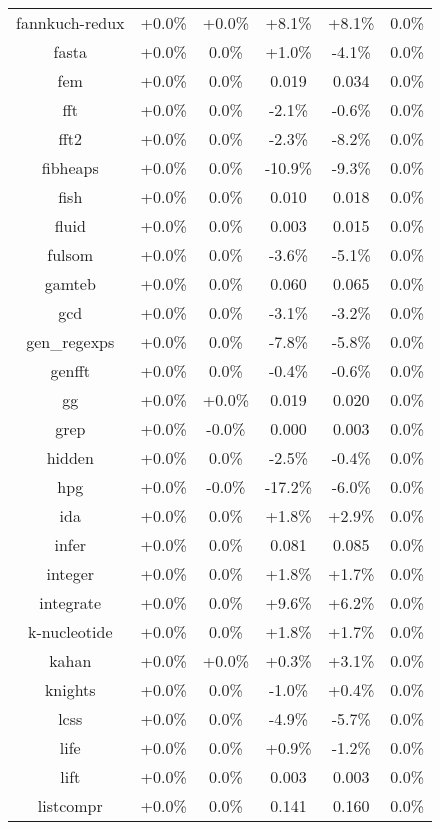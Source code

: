 \begin{tabular}{ c c c c c c }
fannkuch-redux & +0.0\% & +0.0\% & +8.1\% & +8.1\% &  0.0\%\\
fasta & +0.0\% &  0.0\% & +1.0\% & -4.1\% &  0.0\%\\
fem & +0.0\% &  0.0\% & 0.019 & 0.034 &  0.0\%\\
fft & +0.0\% &  0.0\% & -2.1\% & -0.6\% &  0.0\%\\
fft2 & +0.0\% &  0.0\% & -2.3\% & -8.2\% &  0.0\%\\
fibheaps & +0.0\% &  0.0\% & -10.9\% & -9.3\% &  0.0\%\\
fish & +0.0\% &  0.0\% & 0.010 & 0.018 &  0.0\%\\
fluid & +0.0\% &  0.0\% & 0.003 & 0.015 &  0.0\%\\
fulsom & +0.0\% &  0.0\% & -3.6\% & -5.1\% &  0.0\%\\
gamteb & +0.0\% &  0.0\% & 0.060 & 0.065 &  0.0\%\\
gcd & +0.0\% &  0.0\% & -3.1\% & -3.2\% &  0.0\%\\
gen\_regexps & +0.0\% &  0.0\% & -7.8\% & -5.8\% &  0.0\%\\
genfft & +0.0\% &  0.0\% & -0.4\% & -0.6\% &  0.0\%\\
gg & +0.0\% & +0.0\% & 0.019 & 0.020 &  0.0\%\\
grep & +0.0\% & -0.0\% & 0.000 & 0.003 &  0.0\%\\
hidden & +0.0\% &  0.0\% & -2.5\% & -0.4\% &  0.0\%\\
hpg & +0.0\% & -0.0\% & -17.2\% & -6.0\% &  0.0\%\\
ida & +0.0\% &  0.0\% & +1.8\% & +2.9\% &  0.0\%\\
infer & +0.0\% &  0.0\% & 0.081 & 0.085 &  0.0\%\\
integer & +0.0\% &  0.0\% & +1.8\% & +1.7\% &  0.0\%\\
integrate & +0.0\% &  0.0\% & +9.6\% & +6.2\% &  0.0\%\\
k-nucleotide & +0.0\% &  0.0\% & +1.8\% & +1.7\% &  0.0\%\\
kahan & +0.0\% & +0.0\% & +0.3\% & +3.1\% &  0.0\%\\
knights & +0.0\% &  0.0\% & -1.0\% & +0.4\% &  0.0\%\\
lcss & +0.0\% &  0.0\% & -4.9\% & -5.7\% &  0.0\%\\
life & +0.0\% &  0.0\% & +0.9\% & -1.2\% &  0.0\%\\
lift & +0.0\% &  0.0\% & 0.003 & 0.003 &  0.0\%\\
listcompr & +0.0\% &  0.0\% & 0.141 & 0.160 &  0.0\%\\

\end{tabular}
